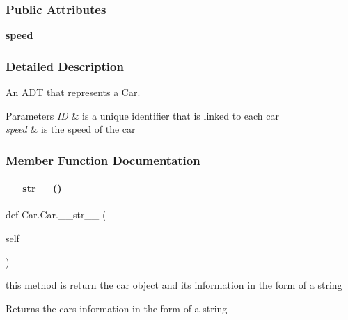 \subsubsection*{Public Attributes}
\begin{DoxyCompactItemize}
\item 
\mbox{\label{class_car_1_1_car_a675d8f58845c245a70197edf155bd060}} 
{\bfseries speed}
\end{DoxyCompactItemize}


\subsubsection{Detailed Description}
An A\+DT that represents a \mbox{\hyperlink{class_car_1_1_car}{Car}}. 


\begin{DoxyParams}{Parameters}
{\em ID} & is a unique identifier that is linked to each car \\
\hline
{\em speed} & is the speed of the car \\
\hline
\end{DoxyParams}


\subsubsection{Member Function Documentation}
\mbox{\label{class_car_1_1_car_adf7632b1116c6adc700293716c383323}} 
\paragraph{\texorpdfstring{\_\_str\_\_()}{\_\_str\_\_()}}
{\footnotesize\ttfamily def Car.\+Car.\+\_\+\+\_\+str\+\_\+\+\_\+ (\begin{DoxyParamCaption}\item[{}]{self }\end{DoxyParamCaption})}



this method is return the car object and it\textquotesingle{}s information in the form of a string 

\begin{DoxyReturn}{Returns}
the car\textquotesingle{}s information in the form of a string 
\end{DoxyReturn}
\mbox{\label{class_car_1_1_car_a6127c1de64360a8a877bbc0e868b2656}} 
